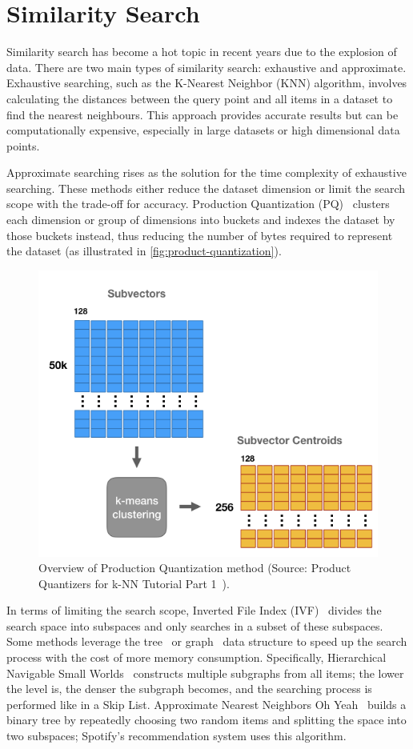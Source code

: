 \section{Similarity Search}
Similarity search has become a hot topic in recent years due to the explosion of data. There are two main types of similarity search: exhaustive and approximate. Exhaustive searching, such as the K-Nearest Neighbor (KNN) algorithm, involves calculating the distances between the query point and all items in a dataset to find the nearest neighbours. This approach provides accurate results but can be computationally expensive, especially in large datasets or high dimensional data points.

Approximate searching rises as the solution for the time complexity of exhaustive searching. These methods either reduce the dataset dimension or limit the search scope with the trade-off for accuracy. Production Quantization (PQ)~\cite{Jegou-TPAMI2010-Product} clusters each dimension or group of dimensions into buckets and indexes the dataset by those buckets instead, thus reducing the number of bytes required to represent the dataset (as illustrated in \autoref{fig:product-quantization}).

\begin{figure}[h!]
    \centering
    \includegraphics[width=0.6\linewidth]{content/resources/images/literature-review/kmeans_clustering.png}
    \caption{Overview of Production Quantization method (Source: Product Quantizers for k-NN Tutorial Part 1~\cite{web-pq}).}
    \label{fig:product-quantization}
\end{figure}

In terms of limiting the search scope, Inverted File Index (IVF)~\cite{Sivic-ICCV2003-Video} divides the search space into subspaces and only searches in a subset of these subspaces. Some methods leverage the tree~\cite{Erik-Github-Annoy} or graph~\cite{Malkov-TPAMI2018-Efficient} data structure to speed up the search process with the cost of more memory consumption. Specifically, Hierarchical Navigable Small Worlds~\cite{Malkov-TPAMI2018-Efficient} constructs multiple subgraphs from all items; the lower the level is, the denser the subgraph becomes, and the searching process is performed like in a Skip List. Approximate Nearest Neighbors Oh Yeah~\cite{Erik-Github-Annoy} builds a binary tree by repeatedly choosing two random items and splitting the space into two subspaces; Spotify's recommendation system uses this algorithm.